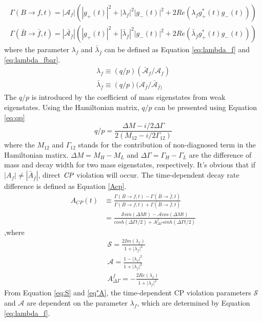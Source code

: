 \begin{eqnarray}
\Gamma(B\to f,t)=|\mathcal{A}_f|(|g_+(t)|^2+|\lambda_f|^2|g_-(t)|^2+2Re(\lambda_f g^*_+(t)g_-(t))) \label{eq:gamma_B}\\
\Gamma(\bar{B}\to \bar{f},t)=|\bar{\mathcal{A}_{\bar{f}}}|(|g_+(t)|^2+|\bar{\lambda}_{\bar{f}}|^2|g_-(t)|^2+2Re(\bar{\lambda}_{\bar{f}} g^*_+(t)g_-(t)))\label{eq:gamma_Bbar}
\end{eqnarray} where the parameter $\lambda_f$ and $\bar{\lambda}_{\bar{f}}$ can be defined as Equation \ref{eq:lambda_f} and \ref{eq:lambda_fbar}.
\begin{eqnarray}
\lambda_f \equiv (q/p) (\bar{\mathcal{A}}_f / \mathcal{A}_f) \label{eq:lambda_f}\\
\bar{\lambda}_{\bar{f}} \equiv (q/p) ( \mathcal{A}_{\bar{f}}/\bar{\mathcal{A}}_{\bar{f})} \label{eq:lambda_fbar}
\end{eqnarray} 
The $q/p$ is introduced by the coefficient of mass eigenstates from weak eigenstates. Using the Hamiltonian matrix, $q/p$ can be presented using Equation \ref{eq:qp}
\begin{equation}\label{eq:qp}
	q/p = \frac{\Delta M - i/2 \Delta \Gamma}{2(M_{12}- i/2 \Gamma_{12})}
\end{equation}
where the $M_{12}$ and $\Gamma_{12}$ stands for the contribution of non-diagnosed term in the Hamiltonian matirx. $\Delta{M}=M_H-M_L$ and $\Delta{\Gamma}=\Gamma_H-\Gamma_L$ are the difference of mass and decay width for two mass eigenstates, respectively.
It's obvious that if $|A_f| \neq |\bar{A}_{\bar{f}}|$, direct $\it{CP}$ violation will occur.  
The time-dependent decay rate difference is defined as Equation \ref{Acp}.
\begin{equation}\label{Acp}
\begin{split}
A_{CP}(t)&\equiv \frac{\Gamma(B\to f,t)-\Gamma(\bar{B}\to \bar{f},t)}{\Gamma(B\to f,t)+\Gamma(\bar{B}\to \bar{f},t)}\\
&=\frac{\mathcal{S} sin(\Delta{M}t)-\mathcal{A}cos(\Delta{M}t)}
{cosh(\Delta \Gamma t/2)+A^f_{\Delta \Gamma}sinh(\Delta \Gamma t/2)}
\end{split}
\end{equation},where
\begin{eqnarray}\label{cp-parameters}
\mathcal{S}=\frac{2Im(\lambda_f)}{1+|\lambda_f|^2} \label{eq:S}\\
\mathcal{A}=\frac{1-|\lambda_f|^2}{1+|\lambda_f|^2}\label{eq:A}\\
A^f_{\Delta \Gamma}=-\frac{2Re(\lambda_f)}{1+|\lambda_f|^2}
\end{eqnarray}
From Equation \ref{eq:S} and \ref{eq"A}, the time-dependent CP violation parameters $\mathcal{S}$ and $\mathcal{A}$ are dependent on the parameter $\lambda_f$, which are determined by Equation \ref{eq:lambda_f}. 

